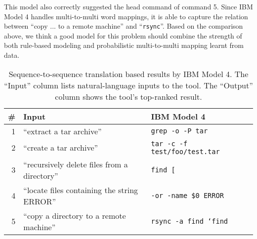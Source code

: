 This model also correctly suggested the head
command of command 5. Since IBM Model 4 handles multi-to-multi word mappings, it is
able to capture the relation between ``copy ... to a remote machine'' and ``\texttt{rsync}''.
Based on the comparison above, we think a good model for this problem should combine the
strength of both rule-based modeling and probabilistic multi-to-multi mapping learnt
from data.

\begin{table}
    \begin{center}
    \begin{tabular}{rll}
        \# & \textbf{Input} &{IBM Model 4} \\
        \hline
        1  & ``extract a tar archive'' & \texttt{grep -o -P tar} \\
        2  & ``create a tar archive''  & \texttt{tar -c -f test/foo/test.tar} \\
        3  & ``recursively delete files from a directory'' & \texttt{find [} \\
        4  & ``locate files containing the string ERROR''  & \texttt{-or -name \$0 ERROR} \\
        5  & ``copy a directory to a remote machine'' & \texttt{rsync -a find `find} \\
    \end{tabular}
    \end{center}
    \caption{Sequence-to-sequence translation based results by IBM Model 4. The ``Input'' column lists
        natural-language inputs to the tool. The ``Output'' column shows the
        tool's top-ranked result.}
    \label{tbl:manual-inspection-ibm4}
\end{table}
